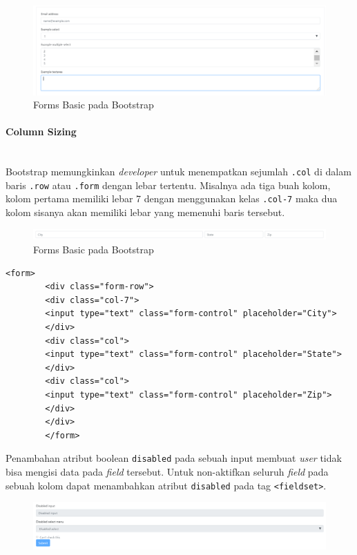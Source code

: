 \documentclass[a4paper,twoside]{article}
\newcommand{\myparagraph}[1]{\paragraph{#1}\mbox{}\\}
\begin{document}
\begin{enumerate}
		\begin{figure} [H]
			\centering  
			\includegraphics[scale=0.7]{formsbasic_bootstrap.png}  
			\caption{Forms Basic pada Bootstrap} 
		\end{figure} 
		\myparagraph{Column Sizing}
		Bootstrap memungkinkan \textit{developer} untuk menempatkan sejumlah \colorbox{mygray}{\texttt{.col}} di dalam baris \colorbox{mygray}{\texttt{.row}} atau \colorbox{mygray}{\texttt{.form}} dengan lebar tertentu. Misalnya ada tiga buah kolom, kolom pertama memiliki lebar 7 dengan menggunakan kelas \colorbox{mygray}{\texttt{.col-7}} maka dua kolom sisanya akan memiliki lebar yang  memenuhi baris tersebut.
		\begin{figure} [H]
			\centering  
			\includegraphics[scale=0.7]{columnsizing_bootstrap.png}  
			\caption{Forms Basic pada Bootstrap} 
		\end{figure} 
		\begin{lstlisting}[frame=single] 
		<form>
		<div class="form-row">
		<div class="col-7">
		<input type="text" class="form-control" placeholder="City">
		</div>
		<div class="col">
		<input type="text" class="form-control" placeholder="State">
		</div>
		<div class="col">
		<input type="text" class="form-control" placeholder="Zip">
		</div>
		</div>
		</form>
		\end{lstlisting}
		Penambahan atribut boolean \colorbox{mygray}{\texttt{disabled}} pada sebuah input membuat \textit{user} tidak bisa mengisi data pada \textit{field} tersebut. Untuk non-aktifkan seluruh \textit{field} pada sebuah kolom dapat menambahkan atribut \texttt{disabled} pada tag \colorbox{mygray}{\texttt{<fieldset>}}.
		\begin{figure} [H]
			\centering  
			\includegraphics[scale=0.7]{disabledforms_bootstrap.png}  

\end{figure}
\end{enumerate}
\end{document}
